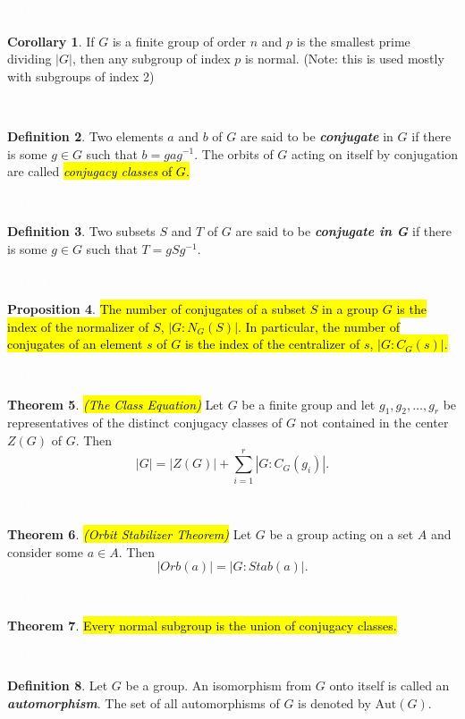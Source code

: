 \documentclass{article}
\theoremstyle{definition}
\newtheorem{thm}{Theorem}[section]
\newtheorem{prop}[thm]{Proposition}
\newtheorem{cor}[thm]{Corollary}
\newtheorem{defn}[thm]{Definition}
\newcommand{\nl}{\textcolor{white}{nothing}}
\newcommand{\inv}{^{-1}}
\newcommand{\Aut}{\text{Aut}}
\begin{document}
\nl

\begin{cor}
If $G$ is a finite group of order $n$ and $p$ is the smallest prime dividing $|G|$, then any subgroup of index $p$ is normal. (Note: this is used mostly with subgroups of index 2)
\end{cor}

\nl

\begin{defn}
Two elements $a$ and $b$ of $G$ are said to be \textbf{\textit{conjugate}} in $G$ if there is some $g\in G$ such that $b = gag\inv$. The orbits of $G$ acting on itself by conjugation are called \hl{\textit{conjugacy classes} of $G$.}
\end{defn}

\nl

\begin{defn}
Two subsets $S$ and $T$ of $G$ are said to be \textbf{\textit{conjugate in G}} if there is some $g\in G$ such that $T= gSg\inv$.
\end{defn}

\nl

\begin{prop}
\hl{The number of conjugates of a subset $S$ in a group $G$ is the index of the normalizer of $S$, $|G:N_G(S)|$. In particular, the number of conjugates of an element $s$ of $G$ is the index of the centralizer of $s$, $|G:C_G(s)|$.}
\end{prop}

\nl

\begin{thm}\hl{\textit{(The Class Equation)}}
Let $G$ be a finite group and let $g_1,g_2,\ldots,g_r$ be representatives of the distinct conjugacy classes of $G$ not contained in the center $Z(G)$ of $G$. Then
\[|G| = |Z(G)| + \sum_{i = 1}^r |G:C_G(g_i)|.\]
\end{thm}

\nl

\begin{thm}\hl{\textit{(Orbit Stabilizer Theorem)}}
Let $G$ be a group acting on a set $A$ and consider some $a\in A$. Then
\[|Orb(a)| = |G:Stab(a)|.\]
\end{thm}

\nl

\begin{thm}
\hl{Every normal subgroup is the union of conjugacy classes.}
\end{thm}

\nl 

\begin{defn}
Let $G$ be a group. An isomorphism from $G$ onto itself is called an \textbf{\textit{automorphism}}. The set of all automorphisms of $G$ is denoted by $\Aut(G)$.
\end{defn}
\end{document}
